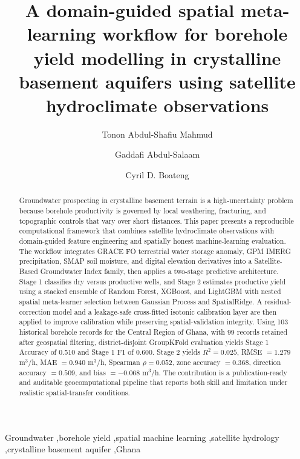 \documentclass[preprint,12pt]{elsarticle}
\begin{document}
\begin{frontmatter}

\title{A domain-guided spatial meta-learning workflow for borehole yield modelling in crystalline basement aquifers using satellite hydroclimate observations}

\author[cs]{Tonon Abdul-Shafiu Mahmud}
\author[cs]{Gaddafi Abdul-Salaam}
\author[phy]{Cyril D. Boateng}

\address[cs]{Department of Computer Science, Kwame Nkrumah University of Science and Technology, Kumasi, Ghana}
\address[phy]{Department of Physics, Kwame Nkrumah University of Science and Technology, Kumasi, Ghana}

\begin{abstract}
Groundwater prospecting in crystalline basement terrain is a high-uncertainty problem because borehole productivity is governed by local weathering, fracturing, and topographic controls that vary over short distances. This paper presents a reproducible computational framework that combines satellite hydroclimate observations with domain-guided feature engineering and spatially honest machine-learning evaluation. The workflow integrates GRACE FO terrestrial water storage anomaly, GPM IMERG precipitation, SMAP soil moisture, and digital elevation derivatives into a Satellite-Based Groundwater Index family, then applies a two-stage predictive architecture. Stage 1 classifies dry versus productive wells, and Stage 2 estimates productive yield using a stacked ensemble of Random Forest, XGBoost, and LightGBM with nested spatial meta-learner selection between Gaussian Process and SpatialRidge. A residual-correction model and a leakage-safe cross-fitted isotonic calibration layer are then applied to improve calibration while preserving spatial-validation integrity. Using 103 historical borehole records for the Central Region of Ghana, with 99 records retained after geospatial filtering, district-disjoint GroupKFold evaluation yields Stage 1 Accuracy of 0.510 and Stage 1 F1 of 0.600. Stage 2 yields $R^2=0.025$, RMSE $=1.279$ m$^3$/h, MAE $=0.940$ m$^3$/h, Spearman $\rho=0.052$, zone accuracy $=0.368$, direction accuracy $=0.509$, and bias $=-0.068$ m$^3$/h. The contribution is a publication-ready and auditable geocomputational pipeline that reports both skill and limitation under realistic spatial-transfer conditions.
\end{abstract}

\begin{keyword}
Groundwater \sep borehole yield \sep spatial machine learning \sep satellite hydrology \sep crystalline basement aquifer \sep Ghana
\end{keyword}

\end{frontmatter}
\end{document}
